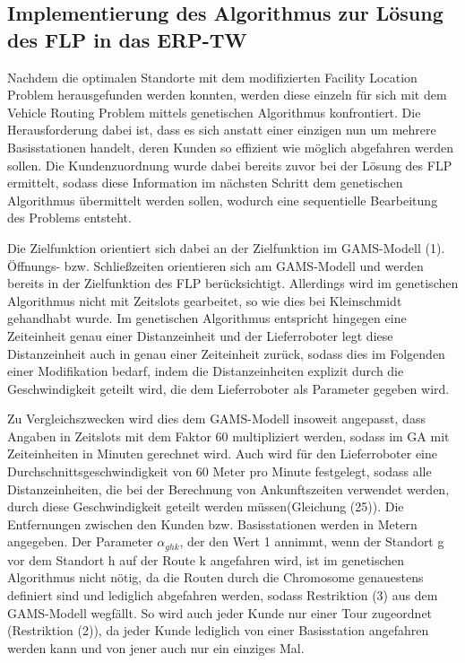 \documentclass[a4paper,12pt,parskip,bibtotoc,liststotoc]{article}
\begin{document}
\subsection{Implementierung des Algorithmus zur Lösung des FLP in das ERP-TW}


Nachdem die optimalen Standorte mit dem modifizierten Facility Location Problem herausgefunden werden konnten, werden diese einzeln für sich mit dem Vehicle Routing Problem mittels genetischen Algorithmus konfrontiert.
Die Herausforderung dabei ist, dass es sich anstatt einer einzigen nun um mehrere Basisstationen handelt, deren Kunden so effizient wie möglich abgefahren werden sollen.
Die Kundenzuordnung wurde dabei bereits zuvor bei der Lösung des FLP ermittelt, sodass diese Information im nächsten Schritt dem genetischen Algorithmus übermittelt werden sollen, wodurch eine sequentielle Bearbeitung des Problems entsteht.

Die Zielfunktion orientiert sich dabei an der Zielfunktion im GAMS-Modell (1).
Öffnungs- bzw. Schließzeiten orientieren sich am GAMS-Modell und werden bereits in der Zielfunktion des FLP berücksichtigt.
Allerdings wird im genetischen Algorithmus nicht mit Zeitslots gearbeitet, so wie dies bei Kleinschmidt gehandhabt wurde.
Im genetischen Algorithmus entspricht hingegen eine Zeiteinheit genau einer Distanzeinheit und der Lieferroboter legt diese Distanzeinheit auch in genau einer Zeiteinheit zurück, sodass dies im Folgenden einer Modifikation bedarf, indem die Distanzeinheiten explizit durch die Geschwindigkeit geteilt wird, die dem Lieferroboter als Parameter gegeben wird.

Zu Vergleichszwecken wird dies dem GAMS-Modell insoweit angepasst, dass Angaben in Zeitslots mit dem Faktor 60 multipliziert werden, sodass im GA mit Zeiteinheiten in Minuten gerechnet wird. 
Auch wird für den Lieferroboter eine Durchschnittsgeschwindigkeit von 60 Meter pro Minute festgelegt, sodass alle Distanzeinheiten, die bei der Berechnung von Ankunftszeiten verwendet werden, durch diese Geschwindigkeit geteilt werden müssen(Gleichung (25)).
Die Entfernungen zwischen den Kunden bzw. Basisstationen werden in Metern angegeben.
Der Parameter $\alpha_{ghk}$, der den Wert 1 annimmt, wenn der Standort g vor dem Standort h auf der Route k angefahren wird, ist im genetischen Algorithmus nicht nötig, da die Routen durch die Chromosome genauestens definiert sind und lediglich abgefahren werden, sodass Restriktion (3) aus dem GAMS-Modell wegfällt.
So wird auch jeder Kunde nur einer Tour zugeordnet (Restriktion (2)), da jeder Kunde lediglich von einer Basisstation angefahren werden kann und von jener auch nur ein einziges Mal.
\end{document}
